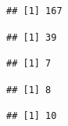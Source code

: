 \documentclass[]{article}
\begin{document}
\begin{verbatim}
## [1] 167
\end{verbatim}

\begin{verbatim}
## [1] 39
\end{verbatim}

\begin{verbatim}
## [1] 7
\end{verbatim}

\begin{verbatim}
## [1] 8
\end{verbatim}

\begin{verbatim}
## [1] 10
\end{verbatim}






\newpage
\theendnotes

\newpage
\begin{auxmulticols}{2}
\singlespacing 


\end{auxmulticols}

\newpage
{
\hypersetup{linkcolor=black}
\setcounter{tocdepth}{3}
\tableofcontents
}
\end{document}
